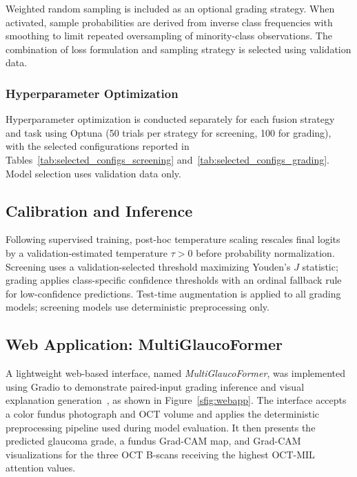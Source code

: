 \documentclass[sn-mathphys]{sn-jnl}%
\theoremstyle{thmstyleone}%
\theoremstyle{thmstyletwo}%
\theoremstyle{thmstylethree}%
\begin{document}
Weighted random sampling is included as an optional grading strategy. When activated, sample probabilities are derived from inverse class frequencies with smoothing to limit repeated oversampling of minority-class observations. The combination of loss formulation and sampling strategy is selected using validation data.

\subsubsection{Hyperparameter Optimization}
\label{subsubsec:hyperparameter_optimization}

Hyperparameter optimization is conducted separately for each fusion strategy and task using Optuna (50 trials per strategy for screening, 100 for grading), with the selected configurations reported in Tables~\ref{tab:selected_configs_screening} and~\ref{tab:selected_configs_grading}. Model selection uses validation data only.

\subsection{Calibration and Inference}
\label{subsec:calibration_inference}

Following supervised training, post-hoc temperature scaling rescales final logits by a validation-estimated temperature $\tau>0$ before probability normalization. Screening uses a validation-selected threshold maximizing Youden's $J$ statistic; grading applies class-specific confidence thresholds with an ordinal fallback rule for low-confidence predictions. Test-time augmentation is applied to all grading models; screening models use deterministic preprocessing only.


\subsection{Web Application: MultiGlaucoFormer}

A lightweight web-based interface, named \textit{MultiGlaucoFormer}, was implemented using Gradio to
demonstrate paired-input grading inference and visual explanation generation~\cite{multiglaucoformer_webapp}, as shown in Figure~\ref{sfig:webapp}.
The interface accepts a color fundus photograph and OCT volume and applies the deterministic preprocessing
pipeline used during model evaluation. It then presents the predicted glaucoma grade, a fundus Grad-CAM
map, and Grad-CAM visualizations for the three OCT B-scans receiving the highest OCT-MIL attention values.
\end{document}

